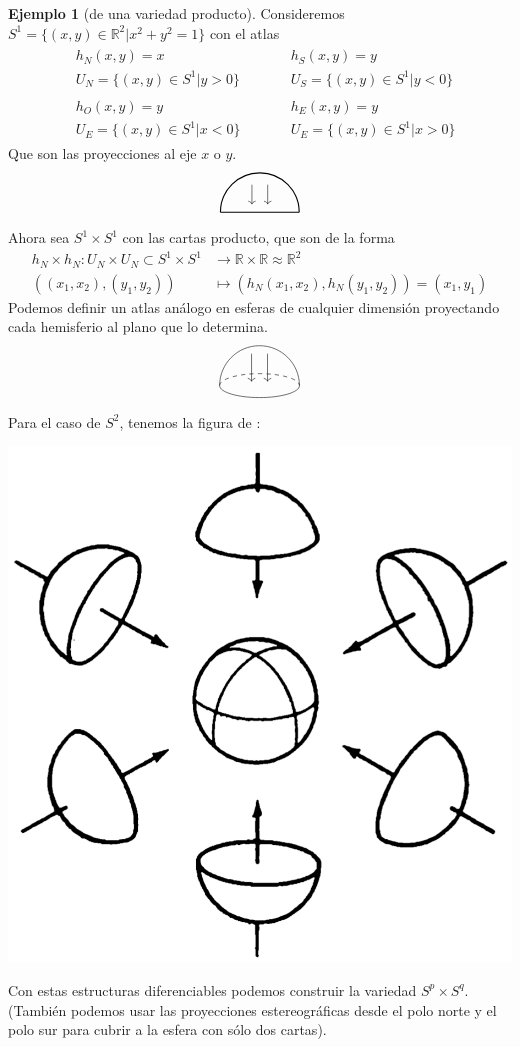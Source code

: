 \documentclass[spanish]{book}
\theoremstyle{definition}
\newtheorem*{ejem}{Ejemplo}
\newcommand{\R}{\mathbb{R}}
\begin{document}
\begin{ejem}[de una variedad producto]
	Consideremos $S^1=\{(x,y)\in\R^2|x^2+y^2=1\}$ con el atlas
	\begin{align*}
		\begin{aligned}
			&h_N(x,y)=x\\
			&U_N=\{(x,y)\in S^1|y>0\}\\\\
			&h_O(x,y)=y\\
			&U_E=\{(x,y)\in S^1|x<0\}
		\end{aligned}
		\qquad
		\begin{aligned}
			&h_S(x,y)=y\\
			&U_S=\{(x,y)\in S^1|y<0\}\\\\
			&h_E(x,y)=y\\
			&U_E=\{(x,y)\in S^1|x>0\}
		\end{aligned}
	\end{align*}
	Que son las proyecciones al eje $x$ o $y$.
	\[\begin{tikzpicture}
		\draw[thick] (1,0) arc (0:180:1);
		\draw[thick] (-1,0) -- (1,0);
		\draw[->] (-.2,0.7)--(-.2,0.2);
		\draw[->] (.2,0.7)--(.2,0.2);
	\end{tikzpicture}\]
	Ahora sea $S^1\times S^1$ con las cartas producto, que son de la forma
	\begin{align*}
		h_N\times h_N:U_N\times U_N\subset S^1\times S^1&\to\R\times\R\approx\R^2\\
		\left((x_1,x_2),(y_1,y_2)\right)&\mapsto\left(h_N(x_1,x_2),h_N(y_1,y_2)\right)=(x_1,y_1)
	\end{align*}
	Podemos definir un atlas análogo en esferas de cualquier dimensión proyectando cada hemisferio al plano que lo determina.
	\[\begin{tikzpicture}[scale=1]
		\draw (-1,0) arc (180:0:1);
		\draw (-1,0) arc (180:360:1 and 0.3);
		\draw[dashed] (-1,0) arc (180:0:1 and 0.3);
		\draw[->] (-.2,0.8)--(-.2,0.1);
		\draw[->] (.2,0.8)--(.2,0.1);
	\end{tikzpicture}\]
	Para el caso de $S^2$, tenemos la figura de \cite{DoCarmo}:
	\begin{center}
		\includegraphics[width=0.5\linewidth]{fig1.png}
	\end{center}
	Con estas estructuras diferenciables podemos construir la variedad $S^p\times S^q$. (También podemos usar las proyecciones estereográficas desde el polo norte y el polo sur para cubrir a la esfera con sólo dos cartas).
\end{ejem}
\end{document}
